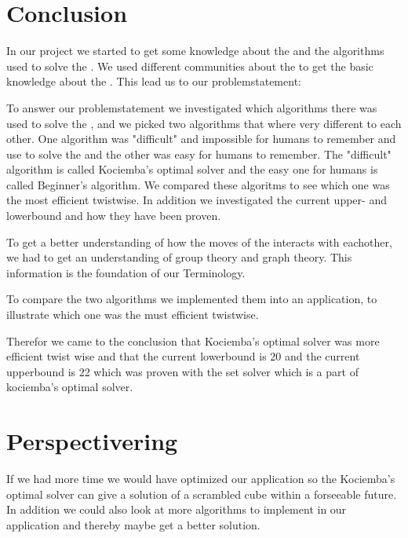 \chapter{Conclusion}
In our project we started to get some knowledge about the \rubik{} and the algorithms used to solve the \rubik{}. We used different communities about the \rubik{} to get the basic knowledge about the \rubik{}. This lead us to our problemstatement:
%

To answer our problemstatement we investigated which algorithms there was used to solve the \rubik{}, and we picked two algorithms that where very different to each other. One algorithm was "difficult" and impossible for humans to remember and use to solve the \rubik{} and the other was easy for humans to remember. The "difficult" algorithm is called Kociemba's optimal solver and the easy one for humans is called Beginner's algorithm. We compared these algoritms to see which one was the most efficient twistwise. In addition we investigated the current upper- and lowerbound and how they have been proven.

To get a better understanding of how the moves of the \rubik{} interacts with eachother, we had to get an understanding of group theory and graph theory. This information is the foundation of our Terminology.

To compare the two algorithms we implemented them into an application, to illustrate which one was the must efficient twistwise. 

Therefor we came to the conclusion that Kociemba's optimal solver was more efficient twist wise and that the current lowerbound is 20 and the current upperbound is 22 which was proven with the set solver which is a part of kociemba's optimal solver.

\chapter{Perspectivering}
If we had more time we would have optimized our application so the Kociemba's optimal solver can give a solution of a scrambled cube within a forseeable future. In addition we could also look at more algorithms to implement in our application and thereby maybe get a better solution.